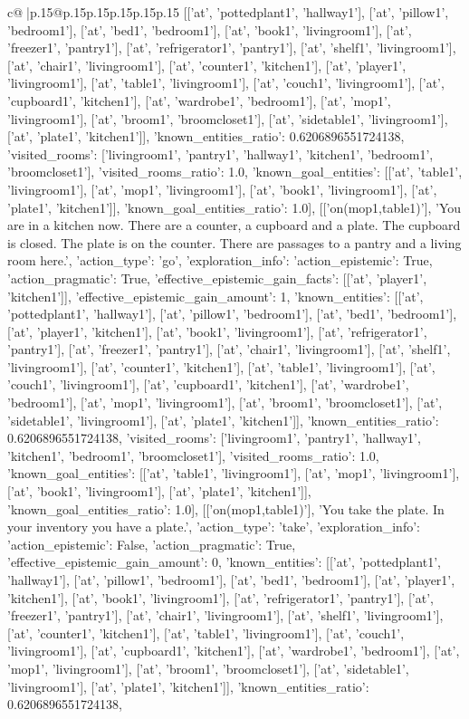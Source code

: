 \documentclass{article}
\begin{document}
{\begin{supertabular}{c@{$\;$}|p{.15\linewidth}@{}p{.15\linewidth}p{.15\linewidth}p{.15\linewidth}p{.15\linewidth}p{.15\linewidth}}
{{{[['at', 'pottedplant1', 'hallway1'], ['at', 'pillow1', 'bedroom1'], ['at', 'bed1', 'bedroom1'], ['at', 'book1', 'livingroom1'], ['at', 'freezer1', 'pantry1'], ['at', 'refrigerator1', 'pantry1'], ['at', 'shelf1', 'livingroom1'], ['at', 'chair1', 'livingroom1'], ['at', 'counter1', 'kitchen1'], ['at', 'player1', 'livingroom1'], ['at', 'table1', 'livingroom1'], ['at', 'couch1', 'livingroom1'], ['at', 'cupboard1', 'kitchen1'], ['at', 'wardrobe1', 'bedroom1'], ['at', 'mop1', 'livingroom1'], ['at', 'broom1', 'broomcloset1'], ['at', 'sidetable1', 'livingroom1'], ['at', 'plate1', 'kitchen1']], 'known_entities_ratio': 0.6206896551724138, 'visited_rooms': ['livingroom1', 'pantry1', 'hallway1', 'kitchen1', 'bedroom1', 'broomcloset1'], 'visited_rooms_ratio': 1.0, 'known_goal_entities': [['at', 'table1', 'livingroom1'], ['at', 'mop1', 'livingroom1'], ['at', 'book1', 'livingroom1'], ['at', 'plate1', 'kitchen1']], 'known_goal_entities_ratio': 1.0}}], [['on(mop1,table1)'], 'You are in a kitchen now. There are a counter, a cupboard and a plate. The cupboard is closed. The plate is on the counter. There are passages to a pantry and a living room here.', {'action_type': 'go', 'exploration_info': {'action_epistemic': True, 'action_pragmatic': True, 'effective_epistemic_gain_facts': [['at', 'player1', 'kitchen1']], 'effective_epistemic_gain_amount': 1, 'known_entities': [['at', 'pottedplant1', 'hallway1'], ['at', 'pillow1', 'bedroom1'], ['at', 'bed1', 'bedroom1'], ['at', 'player1', 'kitchen1'], ['at', 'book1', 'livingroom1'], ['at', 'refrigerator1', 'pantry1'], ['at', 'freezer1', 'pantry1'], ['at', 'chair1', 'livingroom1'], ['at', 'shelf1', 'livingroom1'], ['at', 'counter1', 'kitchen1'], ['at', 'table1', 'livingroom1'], ['at', 'couch1', 'livingroom1'], ['at', 'cupboard1', 'kitchen1'], ['at', 'wardrobe1', 'bedroom1'], ['at', 'mop1', 'livingroom1'], ['at', 'broom1', 'broomcloset1'], ['at', 'sidetable1', 'livingroom1'], ['at', 'plate1', 'kitchen1']], 'known_entities_ratio': 0.6206896551724138, 'visited_rooms': ['livingroom1', 'pantry1', 'hallway1', 'kitchen1', 'bedroom1', 'broomcloset1'], 'visited_rooms_ratio': 1.0, 'known_goal_entities': [['at', 'table1', 'livingroom1'], ['at', 'mop1', 'livingroom1'], ['at', 'book1', 'livingroom1'], ['at', 'plate1', 'kitchen1']], 'known_goal_entities_ratio': 1.0}}], [['on(mop1,table1)'], 'You take the plate. In your inventory you have a plate.', {'action_type': 'take', 'exploration_info': {'action_epistemic': False, 'action_pragmatic': True, 'effective_epistemic_gain_amount': 0, 'known_entities': [['at', 'pottedplant1', 'hallway1'], ['at', 'pillow1', 'bedroom1'], ['at', 'bed1', 'bedroom1'], ['at', 'player1', 'kitchen1'], ['at', 'book1', 'livingroom1'], ['at', 'refrigerator1', 'pantry1'], ['at', 'freezer1', 'pantry1'], ['at', 'chair1', 'livingroom1'], ['at', 'shelf1', 'livingroom1'], ['at', 'counter1', 'kitchen1'], ['at', 'table1', 'livingroom1'], ['at', 'couch1', 'livingroom1'], ['at', 'cupboard1', 'kitchen1'], ['at', 'wardrobe1', 'bedroom1'], ['at', 'mop1', 'livingroom1'], ['at', 'broom1', 'broomcloset1'], ['at', 'sidetable1', 'livingroom1'], ['at', 'plate1', 'kitchen1']], 'known_entities_ratio': 0.6206896551724138, }}}
\end{supertabular}}
\end{document}
